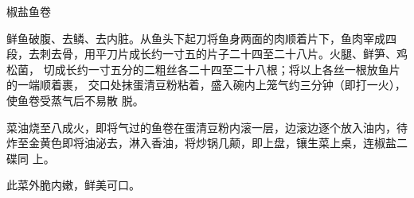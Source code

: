 %
%
%
%
%
%
%
\begin{recipe}{椒盐鱼卷}

\ingredients


\preparation

\step 鲜鱼破腹、去鳞、去内脏。从鱼头下起刀将鱼身两面的肉顺着片下，鱼肉宰成四
段，去刺去骨，用平刀片成长约一寸五的片子二十四至二十八片。火腿、鲜笋、鸡松菌，
切成长约一寸五分的二粗丝各二十四至二十八根；将以上各丝一根放鱼片的一端顺着裹，
交口处抹蛋清豆粉粘着，盛入碗内上笼气约三分钟（即打一火），使鱼卷受蒸气后不易散
脱。

\step 菜油烧至八成火，即将气过的鱼卷在蛋清豆粉内滚一层，边滚边逐个放入油内，待
炸至金黄色即将油泌去，淋入香油，将炒锅几颠，即上盘，镶生菜上桌，连椒盐二碟同
上。

\features

此菜外脆内嫩，鲜美可口。

\end{recipe}

